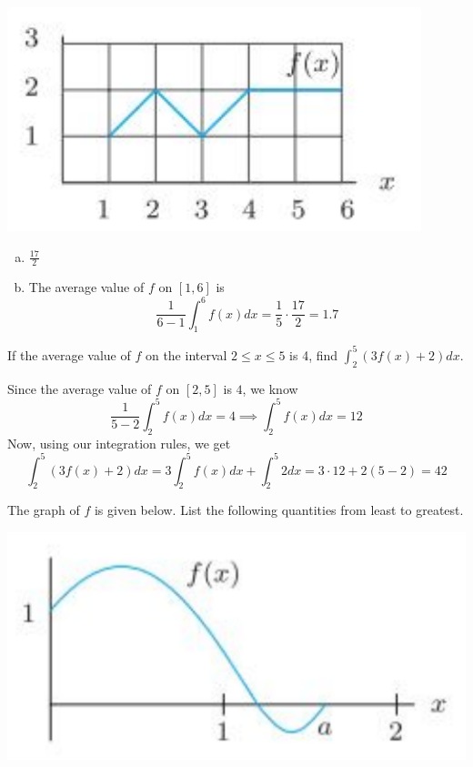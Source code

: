 \documentclass[11pt]{exam}
\begin{document}
\begin{questions}
\begin{multicols}{2}
      \columnbreak
      \includegraphics[scale=0.8]{Figures/graph_f}
    \end{multicols}
    \begin{solution}
      \begin{enumerate}[(a)]
      \item \(\frac{17}{2}\)
      \item The average value of \(f\) on \([1,6]\) is \[
\frac{1}{6-1} \int_1^6 f(x) dx = \frac{1}{5} \cdot \frac{17}{2} = 1.7
        \]
      \end{enumerate}
    \end{solution}
  \question If the average value of $f$ on the interval $2\leq x \leq 5$ is 4, find $\int_2^5(3f(x) + 2) dx$.
    \begin{solution}
      Since the average value of \(f\) on \([2,5]\) is \(4\), we
      know \[
        \frac{1}{5-2} \int_2^5 f(x) dx = 4 \implies \int_2^5 f(x) dx = 12
      \]
      Now, using our integration rules, we get \[
        \int_2^5 (3f(x)+2) dx = 3 \int_2^5 f(x) dx + \int_2^5 2 dx = 3
        \cdot 12 + 2(5-2) = 42
      \]
    \end{solution}
  \question The graph of \(f\) is given below. List the following
    quantities from least to greatest.
    \begin{minipage}{0.5\linewidth}
      \includegraphics[scale=0.8]{Figures/graph_f2}

\end{minipage}
\end{questions}
\end{document}
